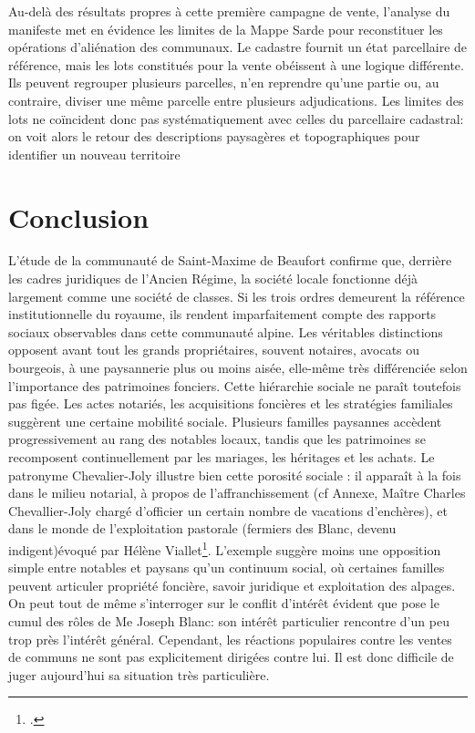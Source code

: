 \documentclass[12pt,a4paper]{report}
\begin{document}
Au-delà des résultats propres à cette première campagne de vente, l'analyse du manifeste met en évidence les limites de la Mappe Sarde pour reconstituer les opérations d'aliénation des communaux. Le cadastre fournit un état parcellaire de référence, mais les lots constitués pour la vente obéissent à une logique différente. Ils peuvent regrouper plusieurs parcelles, n'en reprendre qu'une partie ou, au contraire, diviser une même parcelle entre plusieurs adjudications. Les limites des lots ne coïncident donc pas systématiquement avec celles du parcellaire cadastral: on voit alors le retour des descriptions paysagères et topographiques pour identifier un nouveau territoire

\chapter*{Conclusion}

L'étude de la communauté de Saint-Maxime de Beaufort confirme que, derrière les cadres juridiques de l'Ancien Régime, la société locale fonctionne déjà largement comme une société de classes. Si les trois ordres demeurent la référence institutionnelle du royaume, ils rendent imparfaitement compte des rapports sociaux observables dans cette communauté alpine. Les véritables distinctions opposent avant tout les grands propriétaires, souvent notaires, avocats ou bourgeois, à une paysannerie plus ou moins aisée, elle-même très différenciée selon l'importance des patrimoines fonciers.
Cette hiérarchie sociale ne paraît toutefois pas figée. Les actes notariés, les acquisitions foncières et les stratégies familiales suggèrent une certaine mobilité sociale. Plusieurs familles paysannes accèdent progressivement au rang des notables locaux, tandis que les patrimoines se recomposent continuellement par les mariages, les héritages et les achats.
Le patronyme Chevalier-Joly illustre bien cette porosité sociale : il apparaît à la fois dans le milieu notarial, à propos de l’affranchissement (cf Annexe, Maître Charles Chevallier-Joly chargé d'officier un certain nombre de vacations d'enchères), et dans le monde de l’exploitation pastorale (fermiers des Blanc, devenu indigent)évoqué par Hélène Viallet\footcite[264]{iallet1990Blanc}. L’exemple suggère moins une opposition simple entre notables et paysans qu’un continuum social, où certaines familles peuvent articuler propriété foncière, savoir juridique et exploitation des alpages.
\vspace{1em}
On peut tout de même s'interroger sur le conflit d'intérêt évident que pose le cumul des rôles de Me Joseph Blanc: son intérêt particulier rencontre d'un peu trop près l'intérêt général. Cependant, les réactions populaires contre les ventes de communs ne sont pas explicitement dirigées contre lui. Il est donc difficile de juger aujourd'hui sa situation très particulière.
\vspace{1em}
\end{document}
